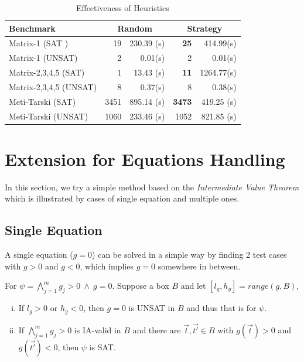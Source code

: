 \documentclass[runningheads,a4paper,oribibl]{llncs}
\begin{document}
\begin{table}[ht]
\begin{center}
\begin{tabular}{ | l | r | r | r | r |}
\hline
    \multicolumn{1}{|l|}{Benchmark} & \multicolumn{2}{c|}{Random} &
    \multicolumn{2}{c|}{Strategy} \\
\hline
    Matrix-1 (SAT ) & 19 & 230.39 (s) & \textbf{25} & 414.99(s)
\\
\hline
    Matrix-1 (UNSAT) & 2 & 0.01(s) & 2 & 0.01(s)
\\
\hline
	Matrix-2,3,4,5 (SAT) & 1 & 13.43 (s) & \textbf{11} & 1264.77(s)
\\
\hline
    Matrix-2,3,4,5 (UNSAT) & 8 & 0.37(s) & 8 & 0.38(s)
\\ \hline
    Meti-Tarski (SAT) & 3451 & 895.14 (s) & \textbf{3473} & 419.25 (s)
\\
\hline
    Meti-Tarski (UNSAT) & 1060 & 233.46 (s) & 1052 & 821.85 (s)
\\
\hline
\end{tabular}
\end{center}
\caption{Effectiveness of Heuristics} 
\label{tab:rasat-experiments}
\end{table}


\section{Extension for Equations Handling} \label{sec:eq}

In this section, we try a simple method based on
the {\em Intermediate Value Theorem} which is illustrated by cases of single equation and multiple ones.

\subsection{Single Equation}
A single equation (${g=0}$) can be solved in a simple way by finding 2 test cases with $g > 0$ and $g < 0$, which implies 
$g=0$ somewhere in between. 

\begin{lemma} \label{lemma:ivt}
For $\psi =
\bigwedge \limits_{j=1}^m g_j > 0~\wedge~g = 0$.
Suppose a box
$B$
and
let ${[l_g, h_g] = range(g, B)}$, 
\begin{enumerate}[(i)]
\item If $l_g > 0$ or $h_g < 0$, then $g = 0$ is UNSAT in $B$ and thus that is for $\psi$.
\item If $\bigwedge \limits_{j=1}^m g_j > 0$ is IA-valid in $B$ and there are $\vec{t},\vec{t'} \in B$
  with $g(\vec{t}) > 0$ and $g(\vec{t'}) < 0$, then $\psi$ is SAT.
\end{enumerate}
\end{lemma}
\end{document}
